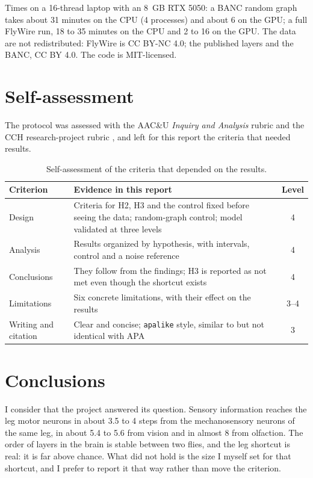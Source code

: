 \documentclass[11pt,letterpaper]{article}
\begin{document}
\noindent Times on a 16-thread laptop with an 8~GB RTX 5050: a BANC random graph takes about 31 minutes on the CPU (4 processes) and about 6 on the GPU; a full FlyWire run, 18 to 35 minutes on the CPU and 2 to 16 on the GPU. The data are not redistributed: FlyWire is CC BY-NC 4.0; the published layers and the BANC, CC BY 4.0. The code is MIT-licensed.

\section{Self-assessment}

The protocol was assessed with the AAC\&U \emph{Inquiry and Analysis} rubric \citep{aacu2009} and the CCH research-project rubric \citep{cchunam}, and left for this report the criteria that needed results.

\begin{table}[H]
\centering
\small
{}
\begin{tabularx}{\linewidth}{@{}p{3.1cm}Lc@{}}
\toprule
\textbf{Criterion} & \textbf{Evidence in this report} & \textbf{Level} \\
\midrule
Design & Criteria for H2, H3 and the control fixed before seeing the data; random-graph control; model validated at three levels & 4 \\
Analysis & Results organized by hypothesis, with intervals, control and a noise reference & 4 \\
Conclusions & They follow from the findings; H3 is reported as not met even though the shortcut exists & 4 \\
Limitations & Six concrete limitations, with their effect on the results & 3--4 \\
Writing and citation & Clear and concise; \texttt{apalike} style, similar to but not identical with APA & 3 \\
\bottomrule
\end{tabularx}
\caption{Self-assessment of the criteria that depended on the results.}
\end{table}

\section{Conclusions}

I consider that the project answered its question. Sensory information reaches the leg motor neurons in about 3.5 to 4 steps from the mechanosensory neurons of the same leg, in about 5.4 to 5.6 from vision and in almost 8 from olfaction. The order of layers in the brain is stable between two flies, and the leg shortcut is real: it is far above chance. What did not hold is the size I myself set for that shortcut, and I prefer to report it that way rather than move the criterion.
\end{document}
